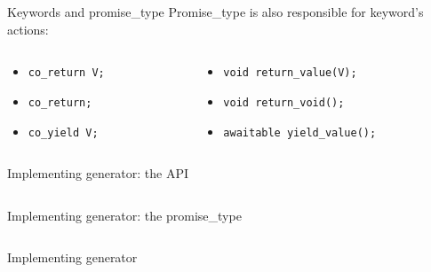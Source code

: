 \documentclass[10pt]{beamer}
\begin{document}
\begin{frame}{Keywords and promise\_type}
	Promise\_type is also responsible for keyword's actions:
	\vfill

	\begin{columns}
		\begin{column}{0.48\linewidth}
			\begin{footnotesize}
			\begin{itemize}[<+-|alert@+>]
				\item \texttt{co\_return V;}
				\item \texttt{co\_return;}
				\item \texttt{co\_yield V;}
			\end{itemize}
			\end{footnotesize}	
		\end{column}
		\begin{column}{0.48\linewidth}
			\begin{footnotesize}
			\begin{itemize}[<+-|alert@+>]
				\item<1- |alert@1> \texttt{void return\_value(V);}
				\item<2- |alert@2> \texttt{void return\_void();}
				\item<3- |alert@3> \texttt{awaitable yield\_value();}
			\end{itemize}
			\end{footnotesize}	
		\end{column}
	\end{columns}
\end{frame}

\begin{frame}{Implementing generator: the API}
	\inputminted[firstline=7, lastline=18, fontsize=\footnotesize]{c++}{code-examples/cppcoro/generator.cpp}
\end{frame}

\begin{frame}{Implementing generator: the promise\_type}
	\inputminted[firstline=20, lastline=41, fontsize=\scriptsize]{c++}{code-examples/cppcoro/generator.cpp}
\end{frame}

\begin{frame}{Implementing generator}
	\inputminted[fontsize=\scriptsize]{c++}{code-examples/cppcoro/generator_impl.cpp}
\end{frame}
\end{document}
